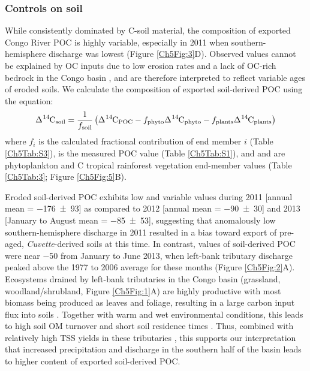 \subsubsection{Controls on soil }

While consistently dominated by C-soil material, the  composition of exported Congo River POC is highly variable, especially in 2011 when southern-hemisphere discharge was lowest (Figure \ref{Ch5Fig:3}D). Observed  values cannot be explained by OC inputs due to low erosion rates and a lack of OC-rich bedrock in the Congo basin \citep{Copard:2007bf}, and are therefore interpreted to reflect variable ages of eroded soils. We calculate the  composition of exported soil-derived POC using the equation:
%
\begin{equation}\label{Ch5Eq:4}
	\ce{\Delta^{14}C}_{\text{soil}} = \frac{1}{f_{\text{soil}}} \left(\ce{\Delta^{14}C}_{\text{POC}} - f_{\text{phyto}}\ce{\Delta^{14}C}_{\text{phyto}} - f_{\text{plants}}\ce{\Delta^{14}C}_{\text{plants}} \right)
\end{equation}
%
where $f_i$ is the calculated fractional contribution of end member $i$ (Table \ref{Ch5Tab:S3}),  is the measured POC  value (Table \ref{Ch5Tab:S1}), and  and  are phytoplankton and C tropical rainforest vegetation end-member values (Table \ref{Ch5Tab:3}; Figure \ref{Ch5Fig:5}B). 

Eroded soil-derived POC exhibits low and variable  values during 2011 [annual mean = \SI{-176 \pm 93}{\permil}] as compared to 2012 [annual mean = \SI{-90 \pm 30}{\permil}] and 2013 [January to August mean = \SI{-85 \pm 53}{\permil}], suggesting that anomalously low southern-hemisphere discharge in 2011 resulted in a bias toward export of pre-aged, \textit{Cuvette}-derived soils at this time. In contrast,  values of soil-derived POC were near \SI{-50}{\permil} from January to June 2013, when left-bank tributary discharge peaked above the 1977 to 2006 average for these months (Figure \ref{Ch5Fig:2}A). Ecosystems drained by left-bank tributaries in the Congo basin (grassland, woodland/shrubland, Figure \ref{Ch5Fig:1}A) are highly productive with most biomass being produced as leaves and foliage, resulting in a large carbon input flux into soils \citep{Bloom:2016gm}. Together with warm and wet environmental conditions, this leads to high soil OM turnover and short soil residence times \citep{Carvalhais:2014dc}. Thus, combined with relatively high TSS yields in these tributaries \citep{Laraque:2009fz}, this supports our interpretation that increased precipitation and discharge in the southern half of the basin leads to higher  content of exported soil-derived POC.

